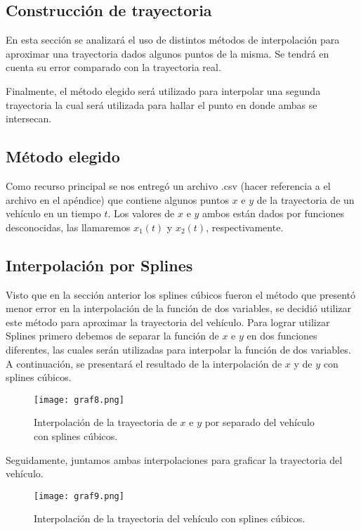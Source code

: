 \documentclass[12pt,a4]{article} %
\begin{document}
\begin{multicols}{2}
\subsection{Construcción de trayectoria}

En esta sección se analizará el uso de distintos métodos de interpolación para aproximar una trayectoria dados algunos puntos de la misma. Se tendrá en cuenta su error comparado con la trayectoria real.

Finalmente, el método elegido será utilizado para interpolar una segunda trayectoria la cual será utilizada para hallar el punto en donde ambas se intersecan.

\subsection{Método elegido}

Como recurso principal se nos entregó un archivo .csv (hacer referencia a el archivo en el apéndice) que contiene algunos puntos $x$ e $y$ de la trayectoria de un vehículo en un tiempo $t$. Los valores de $x$ e $y$ ambos están dados por funciones desconocidas, las llamaremos $x_1(t)$ y $x_2(t)$, respectivamente.

\subsection{Interpolación por Splines}

Visto que en la sección anterior los splines cúbicos fueron el método que presentó menor error en la interpolación de la función de dos variables, se decidió utilizar este método para aproximar la trayectoria del vehículo. Para lograr utilizar Splines primero debemos de separar la función de $x$ e $y$ en dos funciones diferentes, las cuales serán utilizadas para interpolar la función de dos variables. A continuación, se presentará el resultado de la interpolación de $x$ y de $y$ con splines cúbicos.

\begin{figure}[H] 
    \centering
    \texttt{[image: graf8.png]}
    \caption{Interpolación de la trayectoria de $x$ e $y$ por separado del vehículo con splines cúbicos.}
    \label{graf8}
\end{figure}

Seguidamente, juntamos ambas interpolaciones para graficar la trayectoria del vehículo.

\begin{figure}[H] 
    \centering
    \texttt{[image: graf9.png]}
    \caption{Interpolación de la trayectoria del vehículo con splines cúbicos.}
    \label{graf9}
\end{figure}


\end{multicols}
\end{document}
